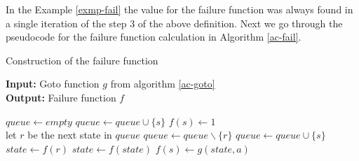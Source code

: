 \documentclass[english,twoside,censored,csm,algorithms-track-2020]{HYthesisML}
\theoremstyle{plain}
\theoremstyle{definition}
\begin{document}
  In the Example \ref{exmp-fail} the value for the failure function was always found in a single
  iteration of the step 3 of the above definition. Next we go through the pseudocode for the failure
  function calculation in Algorithm \ref{ac-fail}.


  \begin{algorithm}[h!]

    \caption{Construction of the failure function} \label{ac-fail}
    \hspace*{\algorithmicindent} \textbf{Input:} Goto function $g$ from algorithm \ref{ac-goto}\\
    \hspace*{\algorithmicindent} \textbf{Output:} Failure function $f$

    \begin{algorithmic}[1]
        \State $queue\gets \textit{empty}$
          \State $queue\gets queue \cup \{s\}$
          \State $f(s)\gets 1$
        \EndFor
        \\
          \hspace*{\algorithmicindent}let $r$ be the next state in $queue$
          \State $queue\gets queue \backslash \{r\}$
            \State $queue\gets queue \cup \{s\}$
            \State $state\gets f(r)$
              \State $state\gets f(state)$
            \EndWhile
            \State $f(s)\gets g(state,a)$              
          \EndFor
        \EndWhile
          
      \EndFunction

    \end{algorithmic}
  \end{algorithm}
\end{document}
